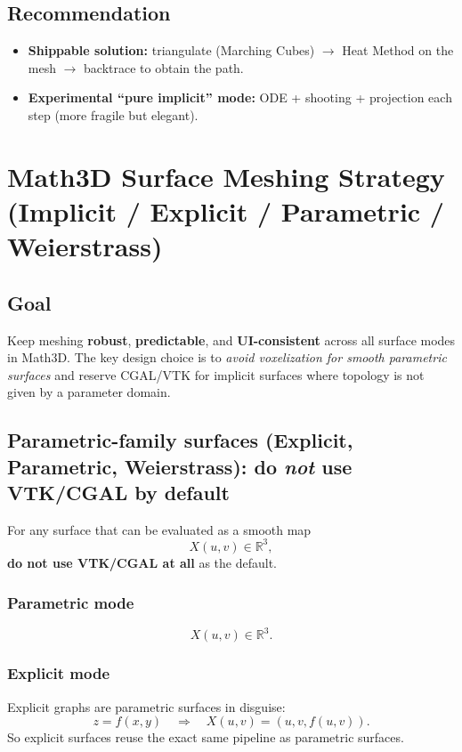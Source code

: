 \documentclass[12pt,a4paper]{article}
\newcommand{\R}{\mathbb{R}}
\theoremstyle{plain}
\theoremstyle{definition}
\begin{document}
	\subsection{Recommendation}
	\begin{itemize}
		\item \textbf{Shippable solution:} triangulate (Marching Cubes) $\rightarrow$ Heat Method on the mesh $\rightarrow$ backtrace to obtain the path.
		\item \textbf{Experimental ``pure implicit'' mode:} ODE + shooting + projection each step (more fragile but elegant).
	\end{itemize}
	
	\section{Math3D Surface Meshing Strategy (Implicit / Explicit / Parametric / Weierstrass)}
	
	\subsection{Goal}
	Keep meshing \textbf{robust}, \textbf{predictable}, and \textbf{UI-consistent} across all surface modes in Math3D.
	The key design choice is to \emph{avoid voxelization for smooth parametric surfaces} and reserve CGAL/VTK for implicit
	surfaces where topology is not given by a parameter domain.
	
	\subsection{Parametric-family surfaces (Explicit, Parametric, Weierstrass): do \emph{not} use VTK/CGAL by default}
	For any surface that can be evaluated as a smooth map
	\[
	X(u,v)\in\R^3,
	\]
	\textbf{do not use VTK/CGAL at all} as the default.
	
		\subsubsection*{Parametric mode}
	\[
	X(u,v)\in\R^3.
	\]
	
		\subsubsection*{Explicit mode}
	Explicit graphs are parametric surfaces in disguise:
	\[
	z=f(x,y)
	\quad\Longrightarrow\quad
	X(u,v)=(u,v,f(u,v)).
	\]
	So explicit surfaces reuse the exact same pipeline as parametric surfaces.
	
\end{document}
